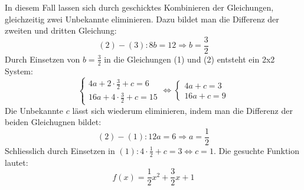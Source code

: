 In diesem Fall lassen sich durch geschicktes Kombinieren der Gleichungen, gleichzeitig zwei Unbekannte eliminieren. Dazu bildet man die Differenz der zweiten und dritten Gleichung:
\[
    (2)-(3):  8b=12 \Rightarrow b=\frac{3}{2}
\]
Durch Einsetzen von $b=\frac{3}{2}$ in die Gleichungen (1) und (2) entsteht ein 2x2 System:
\[
    \begin{cases}
        4a+2\cdot \frac{3}{2}+c=6 \\
        16a+4\cdot \frac{3}{2}+c=15
    \end{cases}
    \iff
    \begin{cases}
        4a+c=3 \\
        16a+c=9
    \end{cases}
\]
Die Unbekannte $c$ lässt sich wiederum eliminieren, indem man die Differenz der beiden Gleichugnen bildet:
\[(2)-(1):  12a=6 \Rightarrow a=\frac{1}{2}\]
Schliesslich durch Einsetzen in $(1): 4\cdot \frac{1}{2}+c=3 \iff c=1$.
Die gesuchte Funktion lautet:
\[f(x)=\frac{1}{2}x^2+\frac{3}{2}x+1\]
\newpage
